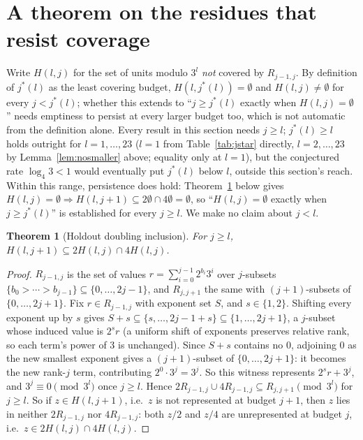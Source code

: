 \documentclass[11pt]{amsart}
\theoremstyle{plain}
\newtheorem{theorem}{Theorem}
\theoremstyle{definition}
\theoremstyle{remark}
\begin{document}
\section{A theorem on the residues that resist coverage}
\label{sec:holdouts}

Write $H(l,j)$ for the set of units modulo $3^l$ \emph{not} covered by $R_{j-1,j}$. By definition of
$j^*(l)$ as the least covering budget, $H(l,j^*(l))=\emptyset$ and $H(l,j)\ne\emptyset$ for every
$j<j^*(l)$; whether this extends to ``$j\ge j^*(l)$ exactly when $H(l,j)=\emptyset$'' needs emptiness
to persist at every larger budget too, which is not automatic from the definition alone. Every result
in this section needs $j\ge l$; $j^*(l) \ge l$ holds outright for $l=1,\dots,23$ ($l=1$ from
Table~\ref{tab:jstar} directly, $l=2,\dots,23$ by Lemma~\ref{lem:nosmaller} above; equality only at
$l=1$), but the conjectured rate $\log_4 3 < 1$ would eventually put
$j^*(l)$ below $l$, outside this section's reach. Within this range, persistence does hold:
Theorem~\ref{thm:doubling}
below gives $H(l,j)=\emptyset\Rightarrow H(l,j+1)\subseteq2\emptyset\cap4\emptyset=\emptyset$, so
``$H(l,j)=\emptyset$ exactly when $j\ge j^*(l)$'' is established for every $j\ge l$. We make no claim
about $j<l$.

\begin{theorem}[Holdout doubling inclusion]
\label{thm:doubling}
For $j \ge l$, $H(l,j+1) \subseteq 2H(l,j) \cap 4H(l,j)$.
\end{theorem}

\begin{proof}
$R_{j-1,j}$ is the set of values $r=\sum_{i=0}^{j-1}2^{b_i}3^i$ over $j$-subsets
$\{b_0>\cdots>b_{j-1}\}\subseteq\{0,\dots,2j-1\}$, and $R_{j,j+1}$ the same with $(j{+}1)$-subsets of
$\{0,\dots,2j+1\}$. Fix $r\in R_{j-1,j}$ with exponent set $S$, and $s\in\{1,2\}$. Shifting every
exponent up by $s$ gives $S+s\subseteq\{s,\dots,2j-1+s\}\subseteq\{1,\dots,2j+1\}$, a $j$-subset
whose induced value is $2^sr$ (a uniform shift of exponents preserves relative rank, so each term's
power of $3$ is unchanged). Since $S+s$ contains no $0$, adjoining $0$ as the new smallest exponent
gives a $(j{+}1)$-subset of $\{0,\dots,2j+1\}$: it becomes the new rank-$j$ term, contributing
$2^0\cdot3^j=3^j$. So this witness represents $2^sr+3^j$, and $3^j\equiv0\pmod{3^l}$ once $j\ge l$.
Hence $2R_{j-1,j}\cup4R_{j-1,j}\subseteq R_{j,j+1}\pmod{3^l}$ for $j\ge l$. So if
$z\in H(l,j+1)$, i.e.\ $z$ is not represented at budget $j+1$, then $z$ lies in neither
$2R_{j-1,j}$ nor $4R_{j-1,j}$: both $z/2$ and $z/4$ are unrepresented at budget $j$, i.e.\
$z\in2H(l,j)\cap4H(l,j)$.
\end{proof}
\end{document}
